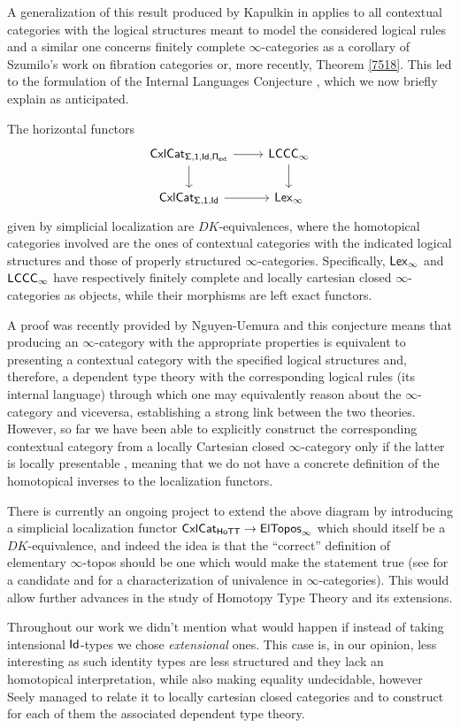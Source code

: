 A generalization of this result produced by Kapulkin in \cite{Kap17}
applies to all contextual categories with the
logical structures meant to model the considered logical rules and a similar one
concerns finitely complete $\infty$-categories as a corollary of Szumilo's
work on fibration categories \cite{Szu14} or, more recently, Theorem \ref{7518}.
This led to the formulation of the Internal Languages Conjecture \cite[Conj.\
3.7]{KL16}, which we now briefly explain as anticipated.

\begin{intlang}\label{intlang}
  The horizontal functors
  \[\begin{tikzcd}
    {\Cxl_{\Sigmas,\mathsf{1},\Ids,\Piext}} & \LCCCi \\
    {\Cxl_{\Sigmas,\mathsf{1},\Ids}} & \Lexi
    \arrow[from=2-1, to=2-2]
    \arrow[from=1-2, to=2-2]
    \arrow[from=1-1, to=2-1]
    \arrow[from=1-1, to=1-2]
  \end{tikzcd}\]
  given by simplicial localization are $DK$-equivalences, where the homotopical
  categories involved are the ones of contextual categories with the indicated
  logical structures and those of properly structured $\infty$-categories.
  Specifically, $\operatorname{\mathsf{Lex}_\infty}$ and $\operatorname{\mathsf{LCCC}_\infty}$ have respectively finitely complete and
  locally cartesian closed $\infty$-categories as objects, while their morphisms
  are left exact functors.
\end{intlang}

A proof was recently provided by Nguyen-Uemura \cite{NU22} and this
conjecture means that producing an $\infty$-category with the appropriate
properties is equivalent to presenting a contextual category with the specified
logical structures and, therefore, a dependent type theory with the
corresponding logical rules (its internal language) through which
one may equivalently reason about the $\infty$-category and viceversa,
establishing a strong link between the two theories.
However, so far we have been able to explicitly construct the corresponding
contextual category from a locally Cartesian closed $\infty$-category only if
the latter is locally presentable \cite{Shu14}, meaning that we do not have a
concrete definition of the homotopical inverses to the localization functors.

There is currently an ongoing project to 
extend the above diagram by introducing a simplicial localization
functor $\operatorname{\mathsf{CxlCat}}_{\mathsf{HoTT}}\rightarrow\operatorname{\mathsf{ElTopos}_\infty}$ which should itself be a
$DK$-equivalence, and indeed the idea is that the ``correct'' definition of
elementary $\infty$-topos should be one which would make the statement true (see
\cite{Ras18} for a candidate and \cite{Ras21} for a characterization of
univalence in $\infty$-categories). This would allow further advances in the
study of Homotopy Type Theory and its extensions.

Throughout our work we didn't mention what would happen if instead of taking
intensional $\operatorname{\mathsf{Id}}$-types we chose \emph{extensional} ones. This case is, in our
opinion, less interesting as such identity types are less structured and they
lack an homotopical interpretation, while also making equality undecidable,
however Seely \cite{See84} managed to relate it to locally cartesian closed
categories and to construct for each of them the associated dependent type
theory.
